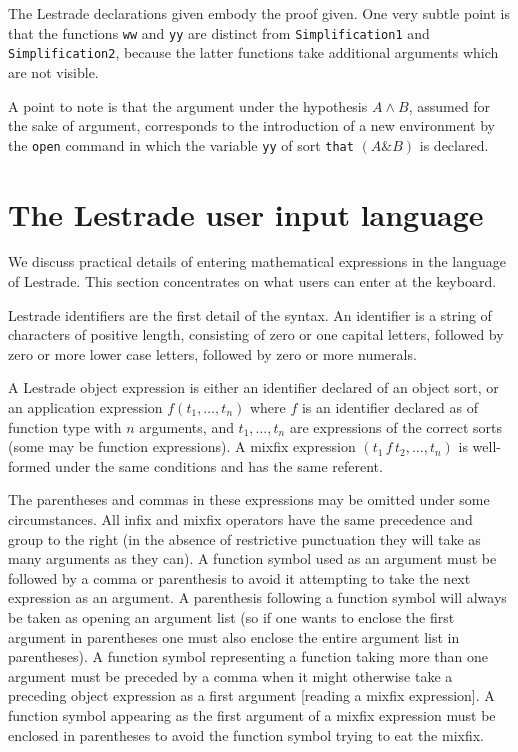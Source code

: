 \documentclass[12pt]{article}
\begin{document}
The Lestrade declarations given embody the proof given.  One very subtle point is that the functions {\tt ww} and {\tt yy} are
distinct from {\tt Simplification1} and {\tt Simplification2}, because the latter functions take additional arguments which are not visible.

A point to note is that the argument under the hypothesis $A \wedge B$, assumed for the sake of argument, corresponds to the introduction of a new environment by the {\tt open} command in which the variable {\tt yy} of sort {\tt that} $(A \& B)$ is declared.

\section{The Lestrade user input language}


We discuss practical details of entering mathematical expressions in the language of Lestrade.  This section concentrates on what users can enter at the keyboard. 

Lestrade identifiers are the first detail of the syntax.  An identifier is a string of characters of positive length, consisting of zero or one capital letters,
followed by zero or more lower case letters, followed by zero or more numerals.

A Lestrade object expression is either an identifier declared of an object sort, or an application expression $f(t_1,\ldots,t_n)$  where $f$ is
an identifier declared as of function type with $n$ arguments, and $t_1,\ldots,t_n$ are expressions of the correct sorts (some may be function expressions).
A mixfix expression $(t_1 \,f \,t_2, \ldots, t_n)$ is well-formed under the same conditions and has the same referent.  

The parentheses and commas in these expressions may be omitted under some circumstances.  All infix and mixfix operators have the same precedence and group to the right (in the absence of restrictive punctuation they will take as many arguments as they can).  A function symbol used as an argument must be followed by a comma or parenthesis to avoid it attempting to take the next expression as an argument.  A parenthesis following a function symbol will always be taken as opening an argument list (so if one wants to enclose the first argument in parentheses one must also enclose the entire argument list in parentheses).  A function symbol representing a function taking more than one argument
must be preceded by a comma when it might otherwise take a preceding object expression as a first argument [reading a mixfix expression].  A function symbol appearing as the first argument of a mixfix expression must be enclosed in parentheses to avoid the function symbol trying to eat the mixfix.
\end{document}
